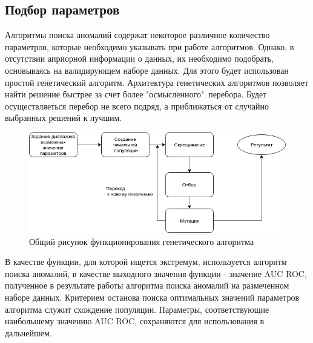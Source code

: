 \subsection{Подбор параметров}
Алгоритмы поиска аномалий содержат некоторое различное количество параметров, которые необходимо указывать при работе алгоритмов. Однако, в отсутствии априорной информации о данных, их необходимо подобрать, основываясь на валидирующем наборе данных. \cite{Book17}
Для этого будет использован простой генетический алгоритм.
Архитектура генетических алгоритмов позволяет найти решение быстрее за счет более "осмысленного"\ перебора. Будет осуществляеться перебор не всего подряд, а приближаться от случайно выбранных решений к лучшим.
\begin{figure}[!h]
	\centering
	\includegraphics[width=.8\textwidth]{diagrams/diagram1.png}
	\caption{ Общий рисунок функционирования генетического алгоритма}
	\label{fig09}
\end{figure}
В качестве функции, для которой ищется экстремум, используется алгоритм поиска аномалий, в качестве выходного значения функции - значение AUC ROC, полученное в результате работы алгоритма поиска аномалий на размеченном наборе данных. Критерием останова поиска оптимальных значений параметров алгоритма служит схождение популяции.
 Параметры, соответствующие наибольшему значению AUC ROC, сохраняются для использования в дальнейшем. 

